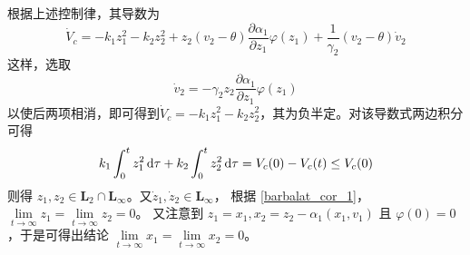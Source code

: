 根据上述控制律，其导数为
\[ \dot{V}_c = - k_1 z^2_1 - k_2 z^2_2 + z_2 (v_2 - \theta) \frac{\partial
   \alpha_1}{\partial z_1} \varphi (z_1) + \frac{1}{\gamma_2} (v_2 - \theta)
   \dot{v}_2 \]
这样，选取\[\dot{v}_2 = - \gamma_2 z_2 \frac{\partial \alpha_1}{\partial z_1}
\varphi (z_1)\]以使后两项相消，即可得到$\dot{V}_c = - k_1 z^2_1 - k_2 z^2_2$，其为负半定。对该导数式两边积分可得
\[ k_1 \int^t_0 z^2_1 \mathop{}\!\mathrm{d} \tau + k_2 \int^t_0 z^2_2 \mathop{}\!\mathrm{d} \tau = V_c (0) - V_c (t)  \leq V_c (0) \]
则得 $z_1, z_2 \in \mathbf{L}_2 \cap \mathbf{L}_{\infty}$。又$\dot{z}_1,
\dot{z}_2 \in \mathbf{L}_{\infty}$，
根据 \ref{barbalat_cor_1}，$\lim\limits_{t \rightarrow \infty} z_1 = \lim\limits_{t \rightarrow
\infty} z_2 = 0$。
又注意到 $z_1 = x_1, x_2 = z_2 - \alpha_1 (x_1, v_1)$ 且 $\varphi (0) = 0$，于是可得出结论 $\lim\limits_{t \rightarrow \infty} x_1 = \lim\limits_{t \rightarrow \infty} x_2 = 0$。
